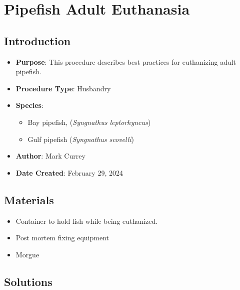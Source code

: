 \documentclass[
  letterpaper,
  DIV=11,
  numbers=noendperiod]{scrreprt}
\providecommand{\tightlist}{%
  \setlength{\itemsep}{0pt}\setlength{\parskip}{0pt}}\usepackage{longtable,booktabs,array}
\begin{document}
\hypertarget{sec-husbandry_adult_syng_euth}{%
\chapter{Pipefish Adult
Euthanasia}\label{sec-husbandry_adult_syng_euth}}

\hypertarget{introduction-60}{%
\section{Introduction}\label{introduction-60}}

\begin{itemize}
\tightlist
\item
  \textbf{Purpose}: This procedure describes best practices for
  euthanizing adult pipefish.
\item
  \textbf{Procedure Type}: Husbandry
\item
  \textbf{Species}:

  \begin{itemize}
  \tightlist
  \item
    Bay pipefish, (\emph{Syngnathus leptorhyncus})
  \item
    Gulf pipefish (\emph{Syngnathus scovelli})
  \end{itemize}
\item
  \textbf{Author}: Mark Currey\\
\item
  \textbf{Date Created}: February 29, 2024
\end{itemize}

\hypertarget{materials-58}{%
\section{Materials}\label{materials-58}}

\begin{itemize}
\tightlist
\item
  Container to hold fish while being euthanized.
\item
  Post mortem fixing equipment
\item
  Morgue
\end{itemize}

\hypertarget{solutions-48}{%
\section{Solutions}\label{solutions-48}}
\end{document}
